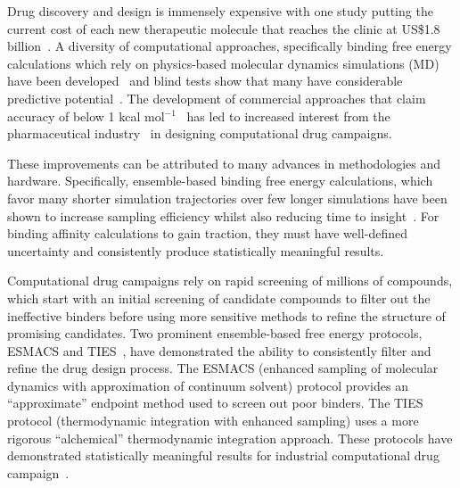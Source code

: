Drug discovery and design is immensely expensive with one study putting the
current cost of each new therapeutic molecule that reaches the clinic at
US\$1.8 billion~\cite{Paul2010}. A diversity of computational approaches,
specifically binding free energy calculations which rely on physics-based
molecular dynamics simulations (MD) have been developed~\cite{Mobley2012} and
blind tests show that many have considerable predictive
potential~\cite{Mey2017,Yin2017}. The development of commercial approaches
that claim accuracy of below 1 kcal mol$^{-1}$~\cite{Wang2015} has led to
increased interest from the pharmaceutical industry~\cite{Ganesan2017} in
designing computational drug campaigns.

These improvements can be attributed to many advances in methodologies and
hardware. Specifically, ensemble-based binding free energy calculations, which
favor many shorter simulation trajectories over few longer simulations have been
shown to increase sampling efficiency whilst also reducing time to
insight~\cite{weis_ligand_2006}. For binding
affinity calculations to gain traction, they must have well-defined uncertainty
and consistently produce statistically meaningful results.

Computational drug campaigns rely on rapid screening of millions of
compounds, which start with an initial screening of candidate compounds to
filter out the ineffective binders before using more sensitive methods to
refine the structure of promising candidates. Two  prominent ensemble-based
free energy protocols, ESMACS and TIES~\cite{Bhati2017}, have demonstrated
the  ability to consistently filter and refine the drug design process. The
ESMACS  (enhanced sampling of molecular dynamics with approximation of
continuum solvent) protocol provides an ``approximate'' endpoint method used
to screen out poor binders. The TIES protocol (thermodynamic integration with
enhanced sampling) uses a more rigorous ``alchemical'' thermodynamic
integration approach. These protocols have demonstrated statistically
meaningful results for industrial computational drug
campaign~\cite{Wan2017brd4}.

